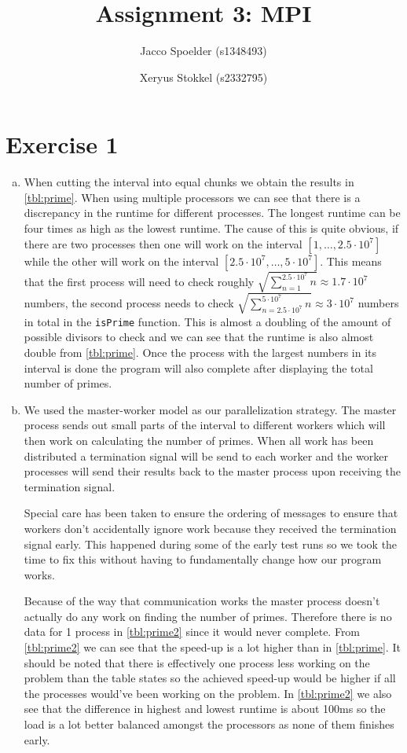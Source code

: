 \documentclass[a4paper]{article}
\title{Assignment 3: MPI}
\author{Jacco Spoelder (s1348493) \and Xeryus Stokkel (s2332795)}
\begin{document}
\maketitle

\section{Exercise 1}
\begin{enumerate}[(a)]
	\item When cutting the interval into equal chunks we obtain the results in \autoref{tbl:prime}. When using multiple processors we can see that there is a discrepancy in the runtime for different processes. The longest runtime can be four times as high as the lowest runtime. The cause of this is quite obvious, if there are two processes then one will work on the interval $[1, \ldots, 2.5 \cdot 10^7]$ while the other will work on the interval $[2.5 \cdot 10^7, \ldots, 5 \cdot 10^7]$. This means that the first process will need to check roughly $\sqrt{\sum_{n=1}^{2.5 \cdot 10^7}n} \approx 1.7 \cdot 10^7$ numbers, the second process needs to check $\sqrt{\sum_{n=2.5\cdot 10^7}^{5\cdot 10^7}n} \approx 3 \cdot 10^7$ numbers in total in the \texttt{isPrime} function. This is almost a doubling of the amount of possible divisors to check and we can see that the runtime is also almost double from \autoref{tbl:prime}. Once the process with the largest numbers in its interval is done the program will also complete after displaying the total number of primes.
	\item We used the master-worker model as our parallelization strategy. The master process sends out small parts of the interval to different workers which will then work on calculating the number of primes. When all work has been distributed a termination signal will be send to each worker and the worker processes will send their results back to the master process upon receiving the termination signal.
	
	Special care has been taken to ensure the ordering of messages to ensure that workers don't accidentally ignore work because they received the termination signal early. This happened during some of the early test runs so we took the time to fix this without having to fundamentally change how our program works.
	
	Because of the way that communication works the master process doesn't actually do any work on finding the number of primes. Therefore there is no data for 1 process in \autoref{tbl:prime2} since it would never complete. From \autoref{tbl:prime2} we can see that the speed-up is a lot higher than in \autoref{tbl:prime}. It should be noted that there is effectively one process less working on the problem than the table states so the achieved speed-up would be higher if all the processes would've been working on the problem. In \autoref{tbl:prime2} we also see that the difference in highest and lowest runtime is about 100ms so the load is a lot better balanced amongst the processors as none of them finishes early.
\end{enumerate}
\end{document}

